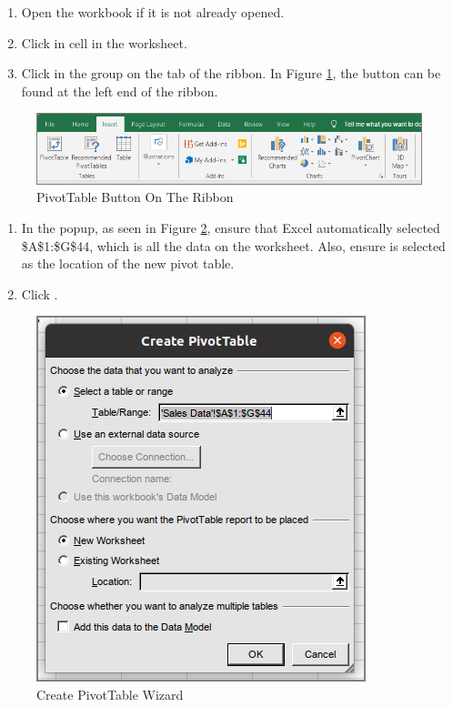\begin{enumerate}
	\item Open the  workbook if it is not already opened.
	\item Click in cell  in the  worksheet.
	\item Click  in the  group on the  tab of the ribbon. In Figure \ref{07:fig11}, the  button can be found at the left end of the ribbon.
\end{enumerate}

\begin{figure}[H]
	\centering
	\includegraphics[width=\maxwidth{.95\linewidth}]{gfx/ch07_fig11}
	\caption{PivotTable Button On The Ribbon}
	\label{07:fig11}
\end{figure}

\begin{enumerate}
	\item In the  popup, as seen in Figure \ref{07:fig12}, ensure that Excel automatically selected \$A\$1:\$G\$44, which is all the data on the worksheet. Also, ensure  is selected as the location of the new pivot table. 
	\item Click .
\end{enumerate}

\begin{figure}[H]
	\centering
	\includegraphics[width=\maxwidth{.95\linewidth}]{gfx/ch07_fig12}
	\caption{Create PivotTable Wizard}
	\label{07:fig12}
\end{figure}


